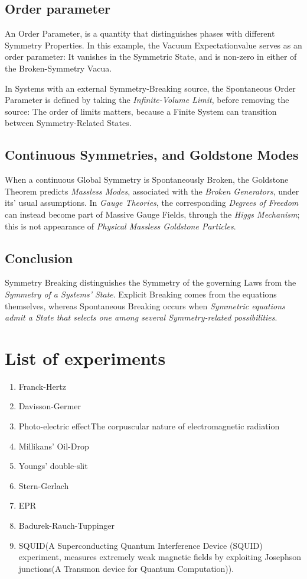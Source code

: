 \documentclass[a4paper, 10pt, onepage]{elegantbook}
\begin{document}
{\subsection{Order parameter}

An Order Parameter, is a quantity that distinguishes phases with different Symmetry Properties. In this example, the 
Vacuum Expectationvalue serves as an order parameter: It vanishes in the Symmetric State, and is non-zero in either of 
the Broken-Symmetry Vacua.  

In Systems with an external Symmetry-Breaking source, the Spontaneous Order Parameter is defined by taking the 
\emph{Infinite-Volume Limit}, before removing the source:
The order of limits matters, because a Finite System can transition between Symmetry-Related States.

\subsection{Continuous Symmetries, and Goldstone Modes}

When a continuous Global Symmetry is Spontaneously Broken, the Goldstone Theorem predicts \emph{Massless Modes}, 
associated with the \emph{Broken Generators}, under its' usual assumptions. In \emph{Gauge Theories}, the corresponding 
\emph{Degrees of Freedom} can instead become part of Massive Gauge Fields, through the \emph{Higgs Mechanism}; this is 
not appearance of \emph{Physical Massless Goldstone Particles}.

\subsection{Conclusion}

Symmetry Breaking distinguishes the Symmetry of the governing Laws from the \emph{Symmetry of a Systems' State}. 
Explicit Breaking comes from the equations themselves, whereas Spontaneous Breaking occurs when \emph{Symmetric 
equations admit a State that selects one among several Symmetry-related possibilities}.



\section{List of experiments}

\begin{enumerate}

\item Franck-Hertz
\item Davisson-Germer
\item Photo-electric effect{The corpuscular nature of electromagnetic radiation}
\item Millikans' Oil-Drop
\item Youngs' double-slit
\item Stern-Gerlach
\item EPR
\item Badurek-Rauch-Tuppinger
\item SQUID(A Superconducting Quantum Interference Device (SQUID) experiment, measures extremely weak magnetic fields 
by exploiting Josephson junctions(A
Transmon device for Quantum Computation)). 


\end{enumerate}}
\end{document}
